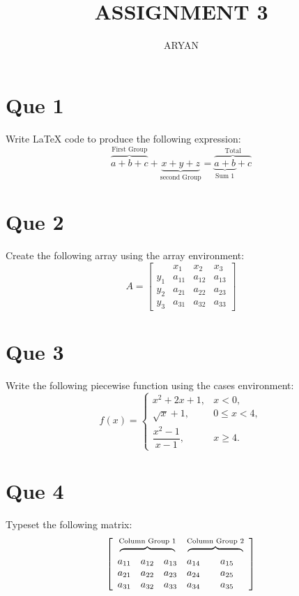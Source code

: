 \documentclass{article}
\title{\textbf{ASSIGNMENT 3}}
\author{ARYAN}
\begin{document}
	\maketitle

	\section*{Que 1}
	Write LaTeX code to produce the following expression:
	\[\overbrace{a+b+c}^{\text{First Group}}
	+\underbrace{x+y+z}_{\text{second Group}}
	=\overbrace{\underbrace{a+b}_{\text{Sum 1}}+c}^{\text{Total}}\]
	
	\section*{Que 2}
	Create the following array using the array environment:
	\[
	A=\left[\begin{array}{c|ccc} 
		   & x_1 &x_2 &x_3 \\
		\hline
		y_1 & a_{11} &a_{12} &a_{13}	\\
		y_2 & a_{21} &a_{22} &a_{23}	\\
		y_3 & a_{31} &a_{32} &a_{33} 
	\end{array}
	\right]
	\]
	
	\section*{Que 3}
	Write the following piecewise function using the cases environment:
	\[f(x)=\begin{cases}
		x^2+2x+1, &x<0, \\[4pt]
		\sqrt{x}+1 , &0\le x<4,\\[4pt]
		\dfrac{x^2-1}{x-1}, & x\ge 4.
	\end{cases}\]
	
	\section*{Que 4}
	Typeset the following matrix:
	\[
	\left[
	\begin{array}{ccccc}
		\multicolumn{3}{c}{\overbrace{\hspace{2cm}}^{\text{Column Group 1}}} &
		\multicolumn{2}{c}{\overbrace{\hspace{2cm}}^{\text{Column Group 2}}} \\ 
		a_{11} & a_{12} & a_{13} & a_{14} & a_{15} \\
		a_{21} & a_{22} & a_{23} & a_{24} & a_{25} \\
		a_{31} & a_{32} & a_{33} & a_{34} & a_{35} 
	\end{array}\right]\]
	
\end{document}
